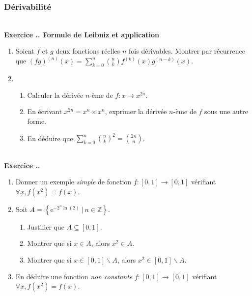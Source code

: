 \documentclass{article}
\newcommand{\mb}[1]{\mathbb{#1}}
\newcounter{exo}
\newcommand{\exercice}[1][\null]{\textbf{\\ Exercice \thesection.\theexo. #1} \addtocounter{exo}{1}}
\begin{document}
\subsubsection{Dérivabilité}


\exercice[Formule de Leibniz et application]

\begin{enumerate}

\item Soient $f$ et $g$ deux fonctions réelles $n$ fois dérivables. Montrer par récurrence que $\displaystyle (fg)^{(n)} (x)= \sum_{k=0}^n {n \choose k} f^{(k)}(x) g^{(n-k)}(x)$.

\item \begin{enumerate}

\item Calculer la dérivée $n$-ème de $f:x \mapsto x^{2n}$.

\item En écrivant $x^{2n} = x^n\times x^n$, exprimer la dérivée $n$-ème de $f$ sous une autre forme.

\item En déduire que $\displaystyle \sum_{k=0}^n {n \choose k}^2 = {2n \choose n}$.

\end{enumerate}

\end{enumerate}

\exercice 

\begin{enumerate}

\item Donner un exemple \emph{simple} de fonction $f:[0,1] \rightarrow [0,1]$ vérifiant $\forall x, f(x^2) = f(x)$.
\item Soit $\displaystyle A = \left\{\text{e}^{-2^n\ln(2)}~\Big|~n \in \mb{Z}\right\}$.

\begin{enumerate}

\item Justifier que $A \subseteq[0,1]$.

\item Montrer que si $x \in A$, alors $x^2 \in A$.

\item Montrer que si $x \in [0,1]\smallsetminus A$, alors $x^2 \in [0,1]\smallsetminus A$.

\end{enumerate}

\item En déduire une fonction \emph{non constante} $f:[0,1] \rightarrow [0,1]$ vérifiant $\forall x, f(x^2) = f(x)$.
\end{enumerate}
\end{document}
